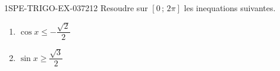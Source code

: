\begin{exercice}{1SPE-TRIGO-EX-037}{2}{12}
Resoudre sur $[0\,;\,2\pi]$ les inequations suivantes.
\begin{enumerate}
  \item $\cos x \leqslant -\dfrac{\sqrt{2}}{2}$
  \item $\sin x \geqslant \dfrac{\sqrt{3}}{2}$
\end{enumerate}
\end{exercice}
